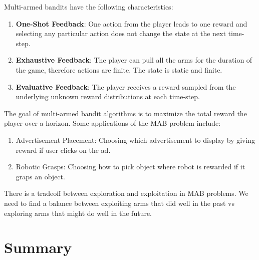 \documentclass[11pt]{article}
\begin{document}
Multi-armed bandits have the following characteristics:
\begin{enumerate}
    \item \textbf{One-Shot Feedback}: One action from the player leads to one reward and selecting any particular action does not change the state at the next time-step. 
    \item \textbf{Exhaustive Feedback}: The player can pull all the arms for the duration of the game, therefore actions are finite. The state is static and finite.
    \item \textbf{Evaluative Feedback}: The player receives a reward sampled from the underlying unknown reward distributions at each time-step.
\end{enumerate}
The goal of multi-armed bandit algorithms is to maximize the total reward the player over a horizon. Some applications of the MAB problem include:
\begin{enumerate}
    \item Advertisement Placement: Choosing which advertisement to display by giving reward if user clicks on the ad.
    \item Robotic Grasps: Choosing how to pick object where robot is rewarded if it graps an object.
\end{enumerate}

There is a tradeoff between exploration and exploitation in MAB problems.
We need to find a balance between exploiting arms that did well in the past vs exploring arms that might do well in the future. 







\section{Summary}
\end{document}
